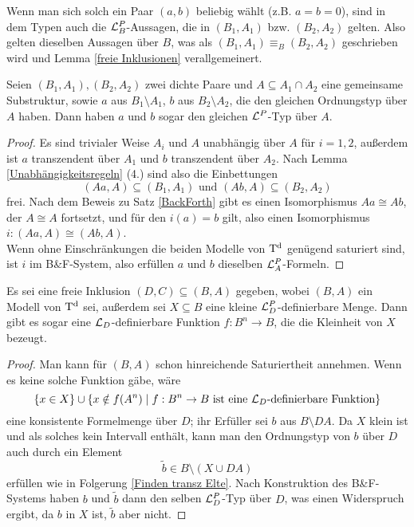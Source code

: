 \begin{corollary}
	Wenn man sich solch ein Paar $(a,b)$ beliebig wählt (z.B. $a=b=0$), sind in dem Typen auch die $\mathcal{L}^P_B$-Aussagen, die in $(B_1,A_1)$ bzw. $(B_2,A_2)$ gelten. Also gelten dieselben Aussagen über $B$, was als $(B_1,A_1)\equiv_B(B_2,A_2)$ geschrieben wird und Lemma \ref{freie Inklusionen} verallgemeinert.
\end{corollary}

\begin{lemma}\label{selber Schnitt}
	Seien $(B_1,A_1),(B_2,A_2)$ zwei dichte Paare und $A\subseteq A_1\cap A_2$ eine gemeinsame Substruktur, sowie $a$ aus $B_1\setminus A_1$, $b$ aus $B_2\setminus A_2$, die den gleichen Ordnungstyp über $A$ haben. Dann haben $a$ und $b$ sogar den gleichen $\mathcal{L}^P$-Typ über $A$.
\end{lemma}
\begin{proof}
	Es sind trivialer Weise $A_i$ und $A$ unabhängig über $A$ für $i=1,2$, außerdem ist $a$ transzendent über $A_1$ und $b$ transzendent über $A_2$. Nach Lemma \ref{Unabhängigkeitsregeln} (4.) sind also die Einbettungen $$(Aa,A)\subseteq(B_1,A_1)\text{ und }(Ab,A)\subseteq(B_2,A_2)$$ frei. Nach dem Beweis zu Satz \ref{BackForth} gibt es einen Isomorphismus $Aa\cong Ab$, der $A\cong A$ fortsetzt, und für den $i(a)=b$ gilt, also einen Isomorphismus $i:(Aa,A)\cong(Ab,A)$.\\ Wenn ohne Einschränkungen die beiden Modelle von $\operatorname{T^d}$ genügend saturiert sind, ist $i$ im B\&F-System, also erfüllen $a$ und $b$ dieselben $\mathcal{L}^P_A$-Formeln.
\end{proof}

\begin{lemma}\label{Speziell definierbare kleine Mengen}
	Es sei eine freie Inklusion $(D,C)\subseteq(B,A)$ gegeben, wobei $(B,A)$ ein Modell von $\operatorname{T^d}$ sei, außerdem sei $X\subseteq B$ eine kleine $\mathcal{L}^P_D$-definierbare Menge. Dann gibt es sogar eine $\mathcal{L}_D$-definierbare Funktion $f:B^n\rightarrow B$, die die Kleinheit von $X$ bezeugt.
\end{lemma}
\begin{proof}
	Man kann für $(B,A)$ schon hinreichende Saturiertheit annehmen. Wenn es keine solche Funktion gäbe, wäre $$\{x\in X\}\cup\{x\notin f(A^n)\mid f:B^n\rightarrow B\text{ ist eine }\mathcal{L}_D\text{-definierbare Funktion}\}$$ eine konsistente Formelmenge über $D$; ihr Erfüller sei $b$ aus $B\setminus DA$. Da $X$ klein ist und als solches kein Intervall enthält, kann man den Ordnungstyp von $b$ über $D$ auch durch ein Element $$\tilde{b}\in B\setminus(X\cup DA)$$ erfüllen wie in Folgerung \ref{Finden transz Elte}. Nach Konstruktion des B\&F-Systems haben $b$ und $\tilde{b}$ dann den selben $\mathcal{L}^P_D$-Typ über $D$, was einen Widerspruch ergibt, da $b$ in $X$ ist, $\tilde{b}$ aber nicht.
\end{proof}
\newpage
